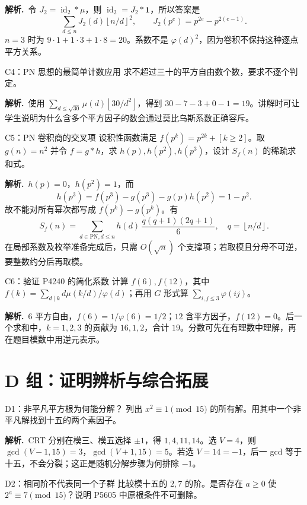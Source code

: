 \documentclass[UTF8,a4paper,11pt,oneside,openany,fontset=fandol]{ctexbook}
\theoremstyle{definition}
\newcommand{\one}{\mathbf 1}
\newcommand{\id}{\operatorname{id}}
\newcommand{\floor}[1]{\left\lfloor #1\right\rfloor}
\newcommand{\sol}{\par\noindent\textbf{解析.}\ }
\begin{document}
\sol 令 $J_2=\id_2*\mu$，则 $\id_2=J_2*\one$，所以答案是
\[
 \sum_{d\le n}J_2(d)\floor{n/d}^2,\qquad
 J_2(p^e)=p^{2e}-p^{2(e-1)}.
\]
$n=3$ 时为 $9\cdot1+1\cdot3+1\cdot8=20$。系数不是 $\varphi(d)^2$，因为卷积不保持这种逐点平方关系。


\begin{problem}{C4：PN 思想的最简单计数应用}
求不超过三十的平方自由数个数，要求不逐个判定。
\end{problem}

\sol 使用 $\sum_{d\le\sqrt{30}}\mu(d)\floor{30/d^2}$，得到 $30-7-3+0-1=19$。讲解时可让学生说明为什么含多个平方因子的数会通过莫比乌斯系数正确容斥。


\begin{problem}{C5：PN 卷积商的交叉项}
设积性函数满足 $f(p^k)=p^{2k}+[k\ge2]$。取 $g(n)=n^2$ 并令 $f=g*h$，求 $h(p),h(p^2),h(p^3)$，设计 $S_f(n)$ 的稀疏求和式。
\end{problem}

\sol $h(p)=0$，$h(p^2)=1$，而
\[
 h(p^3)=f(p^3)-g(p^3)-g(p)h(p^2)=1-p^2.
\]
故不能对所有幂次都写成 $f(p^k)-g(p^k)$。有
\[
 S_f(n)=\sum_{d\in\mathrm{PN},d\le n}h(d)\,
 \frac{q(q+1)(2q+1)}6,\quad q=\floor{n/d}.
\]
在局部系数及枚举准备完成后，只需 $O(\sqrt n)$ 个支撑项；若取模且分母不可逆，要整数约分后再取模。


\begin{problem}{C6：验证 P4240 的简化系数}
计算 $f(6),f(12)$，其中 $f(k)=\sum_{d\mid k}d\mu(k/d)/\varphi(d)$；再用 $G$ 形式算 $\sum_{i,j\le3}\varphi(ij)$。
\end{problem}

\sol $6$ 平方自由，$f(6)=1/\varphi(6)=1/2$；$12$ 含平方因子，$f(12)=0$。后一个求和中，$k=1,2,3$ 的贡献为 $16,1,2$，合计 $19$。分数可先在有理数中理解，再在题目模数中用逆元表示。


\section{D 组：证明辨析与综合拓展}
\begin{problem}{D1：非平凡平方根为何能分解？}
列出 $x^2\equiv1\pmod{15}$ 的所有解。用其中一个非平凡解找到十五的两个素因子。
\end{problem}

\sol CRT 分别在模三、模五选择 $\pm1$，得 $1,4,11,14$。选 $V=4$，则 $\gcd(V-1,15)=3$，$\gcd(V+1,15)=5$。若选 $V=14=-1$，后一 gcd 等于十五，不会分裂；这正是随机分解步骤为何排除 $-1$。


\begin{problem}{D2：相同阶不代表同一个子群}
比较模十五的 $2,7$ 的阶。是否存在 $a\ge0$ 使 $2^a\equiv7\pmod{15}$？说明 P5605 中原根条件不可删除。
\end{problem}
\end{document}

